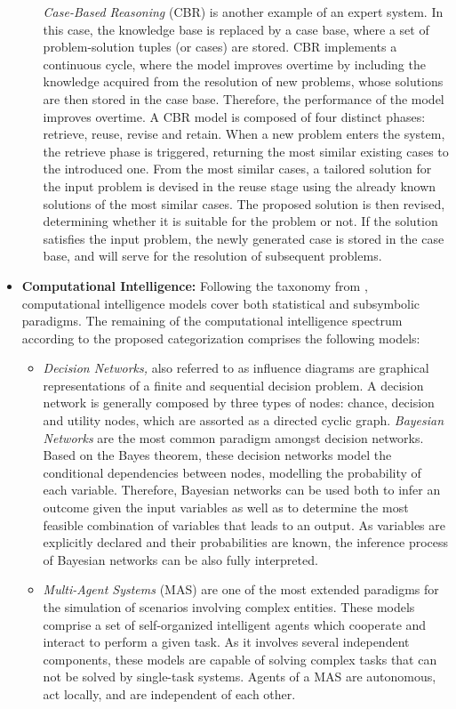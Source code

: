 \begin{itemize}
\begin{itemize}
        \textit{Case-Based Reasoning} (CBR) \citep{overview_cbr} is another example of an expert system. In this case, the knowledge base is replaced by a case base, where a set of problem-solution tuples (or cases) are stored. CBR implements a continuous cycle, where the model improves overtime by including the knowledge acquired from the resolution of new problems, whose solutions are then stored in the case base. Therefore, the performance of the model improves overtime. A CBR model is composed of four distinct phases: retrieve, reuse, revise and retain. When a new problem enters the system, the retrieve phase is triggered, returning the most similar existing cases to the introduced one. From the most similar cases, a tailored solution for the input problem is devised in the reuse stage using the already known solutions of the most similar cases. The proposed solution is then revised, determining whether it is suitable for the problem or not. If the solution satisfies the input problem, the newly generated case is stored in the case base, and will serve for the resolution of subsequent problems.   
    \end{itemize}
    \item \textbf{Computational Intelligence:} Following the taxonomy from \cite{hopgood_2009_knowledge-based}, computational intelligence models cover both statistical and subsymbolic paradigms. The remaining of the computational intelligence spectrum according to the proposed categorization comprises the following models:
    \begin{itemize}
        \item \textit{Decision Networks,} also referred to as influence diagrams \citep{poole_2017_ai_foundations} are graphical representations of a finite and sequential decision problem. A decision network is generally composed by three types of nodes: chance, decision and utility nodes, which are assorted as a directed cyclic graph. \textit{Bayesian Networks} \citep{friedman_1997_bayesian} are the most common paradigm amongst decision networks. Based on the Bayes theorem, these decision networks model the conditional dependencies between nodes, modelling the probability of each variable. Therefore, Bayesian networks can be used both to infer an outcome given the input variables as well as to determine the most feasible combination of variables that leads to an output. As variables are explicitly declared and their probabilities are known, the inference process of Bayesian networks can be also fully interpreted.
        \item \textit{Multi-Agent Systems} (MAS) \citep{Ferber:1999:MSI:520715} are one of the most extended paradigms for the simulation of scenarios involving complex entities. These models comprise a set of self-organized intelligent agents which cooperate and interact to perform a given task. As it involves several independent components, these models are capable of solving complex tasks that can not be solved by single-task systems. Agents of a MAS are autonomous, act locally, and are independent of each other. 

\end{itemize}
\end{itemize}
